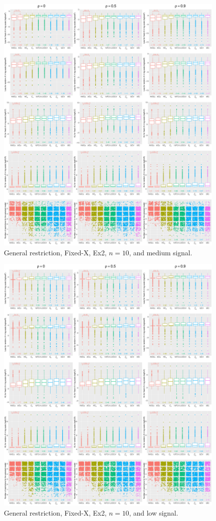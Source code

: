 \clearpage
\begin{figure}[!ht]
\centering
\includegraphics[width=\textwidth]{figures/supplement/fixedx/general_restriction/Ex2_n10_msnr.eps}
\caption{General restriction, Fixed-X, Ex2, $n=10$, and medium signal.}
\end{figure}
\clearpage
\begin{figure}[!ht]
\centering
\includegraphics[width=\textwidth]{figures/supplement/fixedx/general_restriction/Ex2_n10_lsnr.eps}
\caption{General restriction, Fixed-X, Ex2, $n=10$, and low signal.}
\end{figure}
